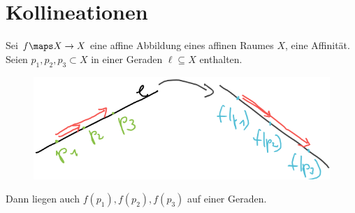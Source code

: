 \section{Kollineationen}
Sei \( f\maps X\to X \) eine affine Abbildung eines affinen Raumes \( X \), \zb eine Affinität. Seien \( p_1,p_2,p_3\subset X \) in einer Geraden \( \ell\subseteq X \) enthalten.
\begin{figure}[H]
    \centering
    \includegraphics[width=0.5\linewidth]{figures/kollineationen_motivation}
    \label{fig:kollineationen_motivation}
\end{figure}
Dann liegen auch \( f(p_1), f(p_2),f(p_3) \) auf einer Geraden.

